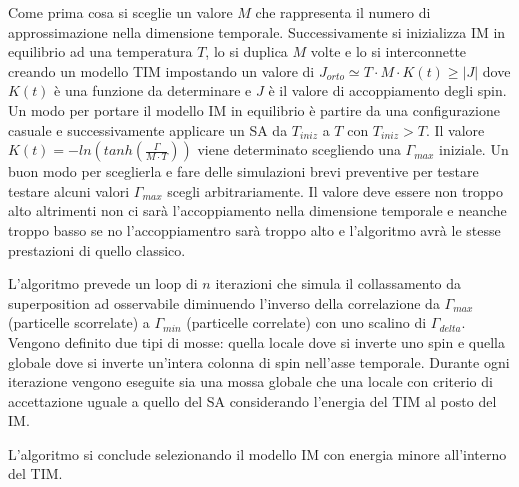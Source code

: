 Come prima cosa si sceglie un valore $M$ che rappresenta il numero di approssimazione nella dimensione temporale.
Successivamente si inizializza IM in equilibrio ad una temperatura $T$, lo si duplica $M$ volte e lo si interconnette creando un modello TIM impostando un valore di $J_{orto} \simeq T \cdot M \cdot K(t) \ge |J|$ dove $K(t)$ è una funzione da determinare e $J$ è il valore di accoppiamento degli spin. Un modo per portare il modello IM in equilibrio è partire da una configurazione casuale e successivamente applicare un SA da $T_{iniz}$ a $T$ con $T_{iniz} > T$.
Il valore $K(t) = -ln(tanh(\frac{\Gamma}{M \cdot T}))$ viene determinato scegliendo una $\Gamma_{max}$ iniziale. Un buon modo per sceglierla e fare delle simulazioni brevi preventive per testare testare alcuni valori $\Gamma_{max}$ scegli arbitrariamente. Il valore deve essere non troppo alto altrimenti non ci sarà l'accoppiamento nella dimensione temporale e neanche troppo basso se no l'accoppiamentro sarà troppo alto e l'algoritmo avrà le stesse prestazioni di quello classico.

L'algoritmo prevede un loop di $n$ iterazioni che simula il collassamento da superposition ad osservabile diminuendo l'inverso della correlazione da $\Gamma_{max}$ (particelle scorrelate) a $\Gamma_{min}$ (particelle correlate) con uno scalino di $\Gamma_{delta}$.
Vengono definito due tipi di mosse: quella locale dove si inverte uno spin e quella globale dove si inverte un'intera colonna di spin nell'asse temporale.
Durante ogni iterazione vengono eseguite sia una mossa globale che una locale con criterio di accettazione uguale a quello del SA considerando l'energia del TIM al posto del IM.

L'algoritmo si conclude selezionando il modello IM con energia minore all'interno del TIM.
